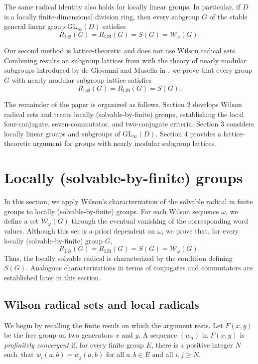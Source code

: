 \documentclass[11pt, reqno]{amsart}
\numberwithin{equation}{section}
\theoremstyle{definition}
\numberwithin{equation}{section}
\begin{document}
The same radical identity also holds for locally linear groups. 
In particular, if $D$ is a locally  finite-dimensional division ring, then every subgroup $G$ of the stable general linear group $\mathrm{GL}_{\infty}(D)$ satisfies
  $$R_{\mathrm{L}\mathfrak{S}}(G) = R_{\mathrm{L}\mathfrak{R}}(G) = S(G) = \mathcal{W}_{\omega}(G).$$

Our second method is lattice-theoretic and does not use Wilson radical sets. 
Combining results on subgroup lattices from \cite{Iwasawa41,Schmidt,Suzuki51} with the theory of nearly modular subgroups introduced by de Giovanni and Musella in \cite{Giovanni}, we prove that every group $G$ with nearly modular subgroup lattice satisfies
  $$R_{\mathrm{L}\mathfrak{S}}(G) = R_{\mathrm{L}\mathfrak{R}}(G) = S(G).$$

The remainder of the paper is organized as follows.  
Section $2$ develops Wilson radical sets and treats locally (solvable-by-finite) groups, establishing the local four-conjugate, seven-commutator, and two-conjugate criteria. 
Section $3$ considers locally linear groups and subgroups of $\mathrm{GL}_{\infty}(D)$. 
Section $4$ provides a lattice-theoretic argument for groups with nearly modular subgroup lattices.

\section{Locally (solvable-by-finite) groups}

In this section, we apply Wilson's characterization of the solvable radical in finite groups to locally (solvable-by-finite) groups.  
For each Wilson sequence $\omega$, we define a set $\mathcal W_\omega(G)$ through the eventual vanishing of the corresponding word values. 
Although this set is a priori dependent on $\omega$, we prove that, for every locally (solvable-by-finite) group $G$, 
$$ R_{\mathrm{L}\mathfrak S}(G) = R_{\mathrm{L}\mathfrak R}(G) = S(G) = \mathcal W_\omega(G).$$ 
Thus, the locally solvable radical is characterized by the condition defining $S(G)$. 
Analogous characterizations in terms of conjugates and commutators are established later in this section. 

\subsection{Wilson radical sets and local radicals} \hfill

\medskip
We begin by recalling the finite result on which the argument rests. 
Let $F(x,y)$ be the free group on two generators $x$ and $y$. 
A sequence $(w_n)$ in $F(x,y)$ is \emph{profinitely convergent} if, for every finite group $E$, there is a positive integer $N$ such~that $w_i(a,b)=w_j(a,b)$ for all $a,b\in E$ and all $i,j\geq N$. 
\end{document}
